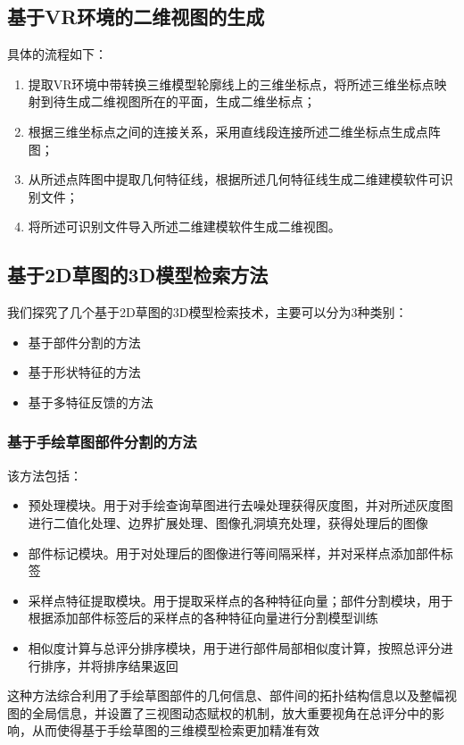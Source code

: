 \documentclass{article}
\begin{document}
\subsection{基于VR环境的二维视图的生成}
具体的流程如下：
\begin{enumerate}
    \item 提取VR环境中带转换三维模型轮廓线上的三维坐标点，将所述三维坐标点映射到待生成二维视图所在的平面，生成二维坐标点；
    \item 根据三维坐标点之间的连接关系，采用直线段连接所述二维坐标点生成点阵图；
    \item 从所述点阵图中提取几何特征线，根据所述几何特征线生成二维建模软件可识别文件；
    \item 将所述可识别文件导入所述二维建模软件生成二维视图。
\end{enumerate}

\subsection{基于2D草图的3D模型检索方法}
我们探究了几个基于2D草图的3D模型检索技术，主要可以分为3种类别：
\begin{itemize}
    \item 基于部件分割的方法
    \item 基于形状特征的方法
    \item 基于多特征反馈的方法
\end{itemize}
\subsubsection{基于手绘草图部件分割的方法}
该方法包括：
\begin{itemize}
    \item 预处理模块。用于对手绘查询草图进行去噪处理获得灰度图，并对所述灰度图进行二值化处理、边界扩展处理、图像孔洞填充处理，获得处理后的图像
    \item 部件标记模块。用于对处理后的图像进行等间隔采样，并对采样点添加部件标签
    \item 采样点特征提取模块。用于提取采样点的各种特征向量；部件分割模块，用于根据添加部件标签后的采样点的各种特征向量进行分割模型训练
    \item 相似度计算与总评分排序模块，用于进行部件局部相似度计算，按照总评分进行排序，并将排序结果返回
\end{itemize}

这种方法综合利用了手绘草图部件的几何信息、部件间的拓扑结构信息以及整幅视图的全局信息，并设置了三视图动态赋权的机制，放大重要视角在总评分中的影响，从而使得基于手绘草图的三维模型检索更加精准有效
\end{document}

